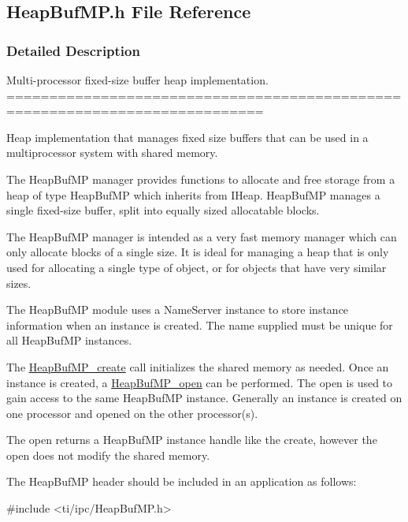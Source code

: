 \subsection{Heap\-Buf\-M\-P.\-h File Reference}
\label{_heap_buf_m_p_8h}


\subsubsection{Detailed Description}
Multi-\/processor fixed-\/size buffer heap implementation. ============================================================================

Heap implementation that manages fixed size buffers that can be used in a multiprocessor system with shared memory.

The Heap\-Buf\-M\-P manager provides functions to allocate and free storage from a heap of type Heap\-Buf\-M\-P which inherits from I\-Heap. Heap\-Buf\-M\-P manages a single fixed-\/size buffer, split into equally sized allocatable blocks.

The Heap\-Buf\-M\-P manager is intended as a very fast memory manager which can only allocate blocks of a single size. It is ideal for managing a heap that is only used for allocating a single type of object, or for objects that have very similar sizes.

The Heap\-Buf\-M\-P module uses a Name\-Server instance to store instance information when an instance is created. The name supplied must be unique for all Heap\-Buf\-M\-P instances.

The \hyperlink{_heap_buf_m_p_8h_a3bb1b659403d9944bc4b64596b20f1f3}{Heap\-Buf\-M\-P\-\_\-create} call initializes the shared memory as needed. Once an instance is created, a \hyperlink{_heap_buf_m_p_8h_a826facae0861c09d545f18dd503f0f0f}{Heap\-Buf\-M\-P\-\_\-open} can be performed. The open is used to gain access to the same Heap\-Buf\-M\-P instance. Generally an instance is created on one processor and opened on the other processor(s).

The open returns a Heap\-Buf\-M\-P instance handle like the create, however the open does not modify the shared memory.

The Heap\-Buf\-M\-P header should be included in an application as follows\-: 
\begin{DoxyCode}
\textcolor{preprocessor}{    #include <ti/ipc/HeapBufMP.h>}
\end{DoxyCode}


